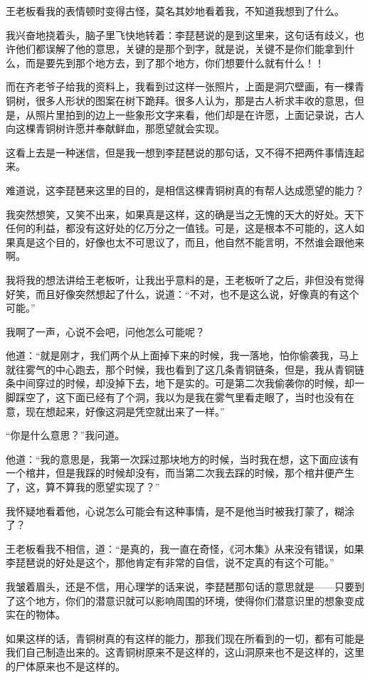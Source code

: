 王老板看我的表情顿时变得古怪，莫名其妙地看着我，不知道我想到了什么。

我兴奋地挠着头，脑子里飞快地转着：李琵琶说的是到这里来，这句话有歧义，也许他们都误解了他的意思，关键的是那个到字，就是说，关键不是你们能拿到什么，而是要先到那个地方去，到了那个地方，你们想要什么就有什么！！

而在齐老爷子给我的资料上，我看到过这样一张照片，上面是洞穴壁画，有一棵青铜树，很多人形状的图案在树下跪拜。很多人认为，那是古人祈求丰收的意思，但是，从照片里拍到的边上一些象形文字来看，他们却是在许愿，上面记录说，古人向这棵青铜树许愿并奉献鲜血，那愿望就会实现。

这看上去是一种迷信，但是我一想到李琵琶说的那句话，又不得不把两件事情连起来。

难道说，这李琵琶来这里的目的，是相信这棵青铜树真的有帮人达成愿望的能力？

我突然想笑，又笑不出来，如果真是这样，这的确是当之无愧的天大的好处。天下任何的利益，都没有这好处的亿万分之一值钱。可是，这是根本不可能的，这人如果真是这个目的，好像也太不可思议了，而且，他自然不能言明，不然谁会跟他来啊。

我将我的想法讲给王老板听，让我出乎意料的是，王老板听了之后，非但没有觉得好笑，而且好像突然想起了什么，说道：“不对，也不是这么说，好像真的有这个可能。”

我啊了一声，心说不会吧，问他怎么可能呢？

他道：“就是刚才，我们两个从上面掉下来的时候，我一落地，怕你偷袭我，马上就往雾气的中心跑去，那个时候，我也看到了这几条青铜链条，但是，我从青铜链条中间穿过的时候，却没掉下去，地下是实的。可是第二次我偷袭你的时候，却一脚踩空了，这下面已经有了个洞，我以为是我在雾气里看走眼了，当时也没有在意，现在想起来，好像这洞是凭空就出来了一样。”

“你是什么意思？”我问道。

他道：“我的意思是，我第一次踩过那块地方的时候，当时我在想，这下面应该有一个棺井，但是我踩的时候却没有，而当第二次我去踩的时候，那个棺井便产生了，这，算不算我的愿望实现了？”

我怀疑地看着他，心说怎么可能会有这种事情，是不是他当时被我打蒙了，糊涂了？

王老板看我不相信，道：“是真的，我一直在奇怪，《河木集》从来没有错误，如果李琵琶说的好处是这个，那他肯定有非常的自信，说不定真的有这个可能。”

我皱着眉头，还是不信，用心理学的话来说，李琵琶那句话的意思就是——只要到了这个地方，你们的潜意识就可以影响周围的环境，使得你们潜意识里的想象变成实在的物体。

如果这样的话，青铜树真的有这样的能力，那我们现在所看到的一切，都有可能是我们自己制造出来的。这青铜树原来不是这样的，这山洞原来也不是这样的，这里的尸体原来也不是这样的。

